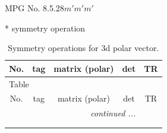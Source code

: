 \documentclass[fleqn,8pt]{jsarticle}
\begin{document}
\setcounter{MaxMatrixCols}{32}

\renewcommand{\tablename}{Table~}
\renewcommand{\figurename}{Figure~}
\begin{center}
\LARGE
MPG No. 8.5.28\quad$m'm'm'$
\end{center}
* symmetry operation
\renewcommand{\arraystretch}{1.3}
\begin{longtable}{ccccc}
\caption{Symmetry operations for 3d polar vector.}
 \\
 \hline \hline
No. & tag & matrix (polar) & det & TR \\ \hline \endfirsthead

\multicolumn{4}{l}{\tablename\ \thetable{}} \\
 \hline \hline
No. & tag & matrix (polar) & det & TR \\ \hline \endhead

 \hline \hline
\multicolumn{4}{r}{\footnotesize\it continued ...} \\ \endfoot

 \hline \hline
\multicolumn{4}{r}{} \\ \endlastfoot


\end{longtable}
\end{document}
